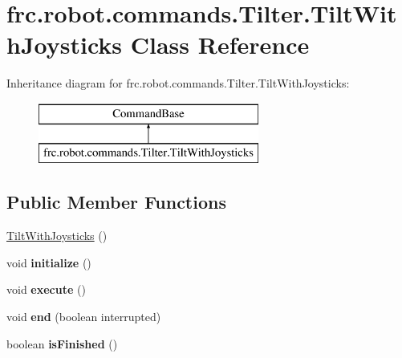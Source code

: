 \hypertarget{classfrc_1_1robot_1_1commands_1_1_tilter_1_1_tilt_with_joysticks}{}\section{frc.\+robot.\+commands.\+Tilter.\+Tilt\+With\+Joysticks Class Reference}
\label{classfrc_1_1robot_1_1commands_1_1_tilter_1_1_tilt_with_joysticks}
Inheritance diagram for frc.\+robot.\+commands.\+Tilter.\+Tilt\+With\+Joysticks\+:\begin{figure}[H]
\begin{center}
\leavevmode
\includegraphics[height=2.000000cm]{classfrc_1_1robot_1_1commands_1_1_tilter_1_1_tilt_with_joysticks}
\end{center}
\end{figure}
\subsection*{Public Member Functions}
\begin{DoxyCompactItemize}
\item 
\mbox{\hyperlink{classfrc_1_1robot_1_1commands_1_1_tilter_1_1_tilt_with_joysticks_a2200a7019aae0e99568ab465db6151e6}{Tilt\+With\+Joysticks}} ()
\item 
\mbox{\label{classfrc_1_1robot_1_1commands_1_1_tilter_1_1_tilt_with_joysticks_adc4b60a4b9fd80cb6741e9442c8c9c5d}} 
void {\bfseries initialize} ()
\item 
\mbox{\label{classfrc_1_1robot_1_1commands_1_1_tilter_1_1_tilt_with_joysticks_ace71bfc29dfb38d2e71887e8046374ef}} 
void {\bfseries execute} ()
\item 
\mbox{\label{classfrc_1_1robot_1_1commands_1_1_tilter_1_1_tilt_with_joysticks_ac2bea186a151ba56996b4e41c82b30bc}} 
void {\bfseries end} (boolean interrupted)
\item 
\mbox{\label{classfrc_1_1robot_1_1commands_1_1_tilter_1_1_tilt_with_joysticks_a3b7343c55c7606d3562e318b64515170}} 
boolean {\bfseries is\+Finished} ()
\end{DoxyCompactItemize}


